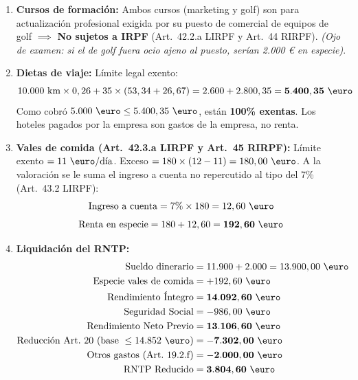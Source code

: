 \documentclass[11pt,a4paper,openany]{article}
\begin{document}
\begin{solucionBox}
\begin{enumerate}
    \item \textbf{Cursos de formación:}
    Ambos cursos (marketing y golf) son para actualización profesional exigida por su puesto de comercial de equipos de golf $\implies$ \textbf{No sujetos a IRPF} (Art.~42.2.a LIRPF y Art.~44 RIRPF). \textit{\small(Ojo de examen: si el de golf fuera ocio ajeno al puesto, serían 2.000 € en especie)}.
    
    \item \textbf{Dietas de viaje:} Límite legal exento:
    $$10.000\text{ km} \times 0,26 + 35 \times (53,34 + 26,67) = 2.600 + 2.800,35 = \mathbf{5.400,35\text{ \euro}}$$
    Como cobró $5.000\text{ \euro} \le 5.400,35\text{ \euro}$, están \textbf{100\% exentas}. Los hoteles pagados por la empresa son gastos de la empresa, no renta.
    
    \item \textbf{Vales de comida (Art.~42.3.a LIRPF y Art.~45 RIRPF):}
    Límite exento $= 11\text{ \euro/día}$. Exceso $= 180 \times (12 - 11) = 180,00\text{ \euro}$.
    A la valoración se le suma el ingreso a cuenta no repercutido al tipo del 7\% (Art.~43.2 LIRPF):
    $$\text{Ingreso a cuenta} = 7\% \times 180 = 12,60\text{ \euro}$$
    $$\text{Renta en especie} = 180 + 12,60 = \mathbf{192,60\text{ \euro}}$$
    
    \item \textbf{Liquidación del RNTP:}
    \begin{align*}
        \text{Sueldo dinerario} &= 11.900 + 2.000 = 13.900,00\text{ \euro} \\
        \text{Especie vales de comida} &= +192,60\text{ \euro} \\
        \mathbf{\text{Rendimiento Íntegro}} &= \mathbf{14.092,60\text{ \euro}} \\
        \text{Seguridad Social} &= -986,00\text{ \euro} \\
        \mathbf{\text{Rendimiento Neto Previo}} &= \mathbf{13.106,60\text{ \euro}} \\
        \text{Reducción Art.~20 (base } \le 14.852\text{ \euro)} &= -\mathbf{7.302,00\text{ \euro}} \\
        \text{Otros gastos (Art.~19.2.f)} &= -\mathbf{2.000,00\text{ \euro}} \\
        \mathbf{\text{RNTP Reducido}} &= \mathbf{3.804,60\text{ \euro}}
    \end{align*}
\end{enumerate}
\end{solucionBox}
\end{document}
